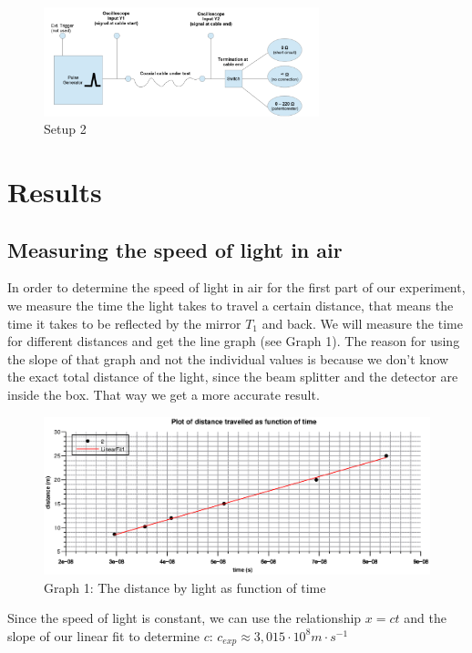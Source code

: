 \documentclass{scrartcl}
\begin{document}
\begin{figure}[h!]
    \centering
    \includegraphics[width=8cm]{exp_2.png}
    \caption{Setup 2}
    \label{fig:setup2}
\end{figure}

\section{Results}

\subsection{Measuring the speed of light in air}
In order to determine the speed of light in air for the first part of our experiment, we measure the time the light takes to travel a certain distance, that means the time it takes to be reflected by the mirror $T_1$ and back. We will measure the time for different distances and get the line graph (see Graph 1).
The reason for using the slope of that graph and not the individual values is because we don't know the exact total distance of the light, since the beam splitter and the detector are inside the box. That way we get a more accurate result.

\begin{figure}[ht]
\centering
\includegraphics[width=13cm]{Graph1.eps}
\caption{Graph 1: The distance by light as function of time}
\label{fig:my_label}
\end{figure}

Since the speed of light is constant, we can use the relationship $x=ct$ and the slope of our linear fit to determine $c$: $\boxed{c_{exp} \approx 3,015 \cdot 10^8 m\cdot s^{-1}}$
\end{document}
